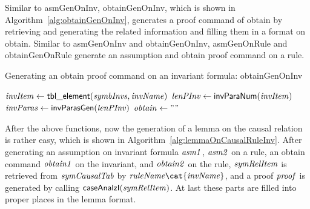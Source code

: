 Similar to {\sf asmGenOnInv}, {\sf obtainGenOnInv},
which is shown in Algorithm~\ref{alg:obtainGenOnInv},
generates a proof command of {\sf obtain} by retrieving and
generating the related information and filling them in a format on {\sf obtain}.
Similar to {\sf asmGenOnInv} and  {\sf obtainGenOnInv},
{\sf asmGenOnRule} and  {\sf obtainGenOnRule} generate an  assumption
and {\sf obtain} proof command   on a rule.

\begin{algorithm}[!t]
\caption{Generating an {\sf obtain} proof command on an invariant formula: obtainGenOnInv}\label{alg:obtainGenOnInv}
${\it invItem}   \leftarrow {\sf tbl\_element}({\it symbInvs,  invName})$\;
${\it lenPInv} \leftarrow {\sf invParaNum}({\it invItem})$\;
${\it invParas} \leftarrow {\sf invParasGen}({\it lenPInv})$\;
    {${\it obtain} \leftarrow  ""$\;}
\end{algorithm}

After the above functions, now the generation of a lemma on the causal relation
is rather easy, which is shown in Algorithm~\ref{alg:lemmaOnCausalRuleInv}.
After generating an assumption on invariant formula ${\it asm1}$,  ${\it asm2}$ on a rule,
an obtain command  ${\it obtain1}$ on the invariant,
and ${\it obtain2}$ on the rule,  ${\it symRelItem}$ is retrieved from ${\it symCausalTab}$
by ${\it ruleName}\cat {\it invName}$,
and a proof ${\it proof}$ is generated by calling ${\sf caseAnalzI}({\it symRelItem})$.
At last these parts are filled into proper places in the lemma format.

